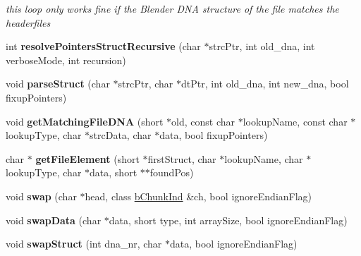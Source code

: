 \begin{DoxyCompactItemize}
\begin{DoxyCompactList}\small\item\em this loop only works fine if the Blender D\+N\+A structure of the file matches the headerfiles \end{DoxyCompactList}\item 
\hypertarget{classb_parse_1_1b_file_ab87a35f4ea6fd5d3efefdb34c52aced6}{int {\bfseries resolve\+Pointers\+Struct\+Recursive} (char $\ast$strc\+Ptr, int old\+\_\+dna, int verbose\+Mode, int recursion)}\label{classb_parse_1_1b_file_ab87a35f4ea6fd5d3efefdb34c52aced6}

\item 
\hypertarget{classb_parse_1_1b_file_a4d4b84673c03817f2a4443207008df23}{void {\bfseries parse\+Struct} (char $\ast$strc\+Ptr, char $\ast$dt\+Ptr, int old\+\_\+dna, int new\+\_\+dna, bool fixup\+Pointers)}\label{classb_parse_1_1b_file_a4d4b84673c03817f2a4443207008df23}

\item 
\hypertarget{classb_parse_1_1b_file_afa0359601d7a70315344d12342c09eee}{void {\bfseries get\+Matching\+File\+D\+N\+A} (short $\ast$old, const char $\ast$lookup\+Name, const char $\ast$lookup\+Type, char $\ast$strc\+Data, char $\ast$data, bool fixup\+Pointers)}\label{classb_parse_1_1b_file_afa0359601d7a70315344d12342c09eee}

\item 
\hypertarget{classb_parse_1_1b_file_ab1102226a3ea19917868f2917266a6ff}{char $\ast$ {\bfseries get\+File\+Element} (short $\ast$first\+Struct, char $\ast$lookup\+Name, char $\ast$lookup\+Type, char $\ast$data, short $\ast$$\ast$found\+Pos)}\label{classb_parse_1_1b_file_ab1102226a3ea19917868f2917266a6ff}

\item 
\hypertarget{classb_parse_1_1b_file_a251cab78d1f7b932dfd705b1b6409d4f}{void {\bfseries swap} (char $\ast$head, class \hyperlink{classb_parse_1_1b_chunk_ind}{b\+Chunk\+Ind} \&ch, bool ignore\+Endian\+Flag)}\label{classb_parse_1_1b_file_a251cab78d1f7b932dfd705b1b6409d4f}

\item 
\hypertarget{classb_parse_1_1b_file_ae64a2a1c675b615773064a534853327a}{void {\bfseries swap\+Data} (char $\ast$data, short type, int array\+Size, bool ignore\+Endian\+Flag)}\label{classb_parse_1_1b_file_ae64a2a1c675b615773064a534853327a}

\item 
\hypertarget{classb_parse_1_1b_file_adee3d154d50396c03f06082d3e560fe7}{void {\bfseries swap\+Struct} (int dna\+\_\+nr, char $\ast$data, bool ignore\+Endian\+Flag)}\label{classb_parse_1_1b_file_adee3d154d50396c03f06082d3e560fe7}


\end{DoxyCompactItemize}
